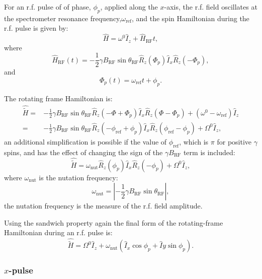 For an r.f. pulse of of phase, $\phi_p$, applied along the $x$-axis, the r.f. field oscillates at the spectrometer resonance frequency,$\omega_{\text{ref}}$, and  the spin Hamiltonian
during the r.f. pulse is given by:
\begin{equation}
  \hat{H} = \omega^0\hat{I}_z + \hat{H}_{\text{RF}}{t},
\end{equation}
where
\begin{equation}
  \hat{H}_{\text{RF}}(t) = -\frac{1}{2}\gamma{B_{\text{RF}}}\sin{\theta_{\text{RF}}}\hat{R}_z(\Phi_p)\hat{I}_x\hat{R}_z(-\Phi_p),
\end{equation}
and
\begin{equation}
  \Phi_p(t) = \omega_{\text{ref}}t + \phi_p.
\end{equation}

The rotating frame Hamiltonian is:
\begin{align}
  \hat{\tilde{H}} =& -\frac{1}{2}\gamma{B_{\text{RF}}}\sin{\theta_{\text{RF}}}\hat{R}_z(-\Phi  +  \Phi_p)\hat{I}_x\hat{R}_z(\Phi-\Phi_p) + (\omega^0 - \omega_\text{ref})\hat{I}_z \\
  =& -\frac{1}{2}\gamma{B_{\text{RF}}}\sin{\theta_{\text{RF}}}\hat{R}_z(-\phi_{\text{ref}}  +  \phi_p)\hat{I}_x\hat{R}_z(\phi_{\text{ref}}-\phi_p) + \Omega^0\hat{I}_z,
\end{align}
an additional simplification is possible if the value of $\phi_{\text{ref}}$, which is
$\pi$ for positive $\gamma$ spins, and has the effect of changing the sign of the $\gamma{B_{\text{RF}}}$
term is included:
\begin{equation}
  \hat{\tilde{H}} = \omega_{\text{nut}}\hat{R}_z(\phi_p)\hat{I}_x\hat{R}_z(-\phi_p) + \Omega^0\hat{I}_z,
\end{equation}
where $\omega_{\text{nut}}$ is the nutation frequency:
\begin{equation}
  \omega_{\text{nut}} = |-\frac{1}{2}\gamma{B_{\text{RF}}}\sin{\theta_{\text{RF}}}|,
\end{equation}
the nutation frequency is the measure of the r.f. field amplitude.

Using the sandwich property again the final form of the rotating-frame Hamiltonian during an r.f. pulse
is:
\begin{equation}
  \hat{\tilde{H}} = \Omega^0\hat{I}_z + \omega_{\text{nut}}(\hat{I}_x\cos\phi_p + \hat{I}y\sin\phi_p).
\end{equation}


\subsubsection{$x$-pulse}

